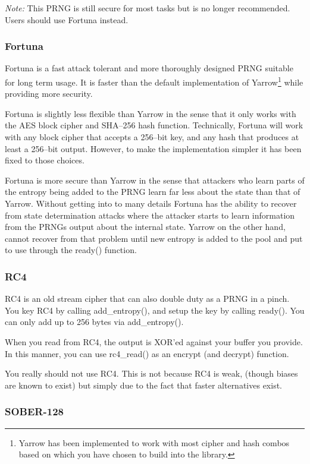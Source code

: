\documentclass[synpaper]{book}
\begin{document}
\textit{Note:} This PRNG is still secure for most tasks but is no longer recommended.  Users
should use Fortuna instead.

\subsubsection{Fortuna}

Fortuna is a fast attack tolerant and more thoroughly designed PRNG suitable for long term
usage.  It is faster than the default implementation of Yarrow\footnote{Yarrow has been implemented
to work with most cipher and hash combos based on which you have chosen to build into the library.} while
providing more security.  

Fortuna is slightly less flexible than Yarrow in the sense that it only works with the AES block cipher 
and SHA--256 hash function.  Technically, Fortuna will work with any block cipher that accepts a 256--bit
key, and any hash that produces at least a 256--bit output.  However, to make the implementation simpler
it has been fixed to those choices.

Fortuna is more secure than Yarrow in the sense that attackers who learn parts of the entropy being 
added to the PRNG learn far less about the state than that of Yarrow.  Without getting into to many
details Fortuna has the ability to recover from state determination attacks where the attacker starts
to learn information from the PRNGs output about the internal state.  Yarrow on the other hand, cannot 
recover from that problem until new entropy is added to the pool and put to use through the ready() function.

\subsubsection{RC4}

RC4 is an old stream cipher that can also double duty as a PRNG in a pinch.  You key RC4 by
calling add\_entropy(), and setup the key by calling ready().  You can only add up to 256 bytes via
add\_entropy().  

When you read from RC4, the output is XOR'ed against your buffer you provide.  In this manner, you can use rc4\_read() 
as an encrypt (and decrypt) function.  

You really should not use RC4.  This is not because RC4 is weak, (though biases are known to exist) but simply due to 
the fact that faster alternatives exist.

\subsubsection{SOBER-128}
\end{document}
